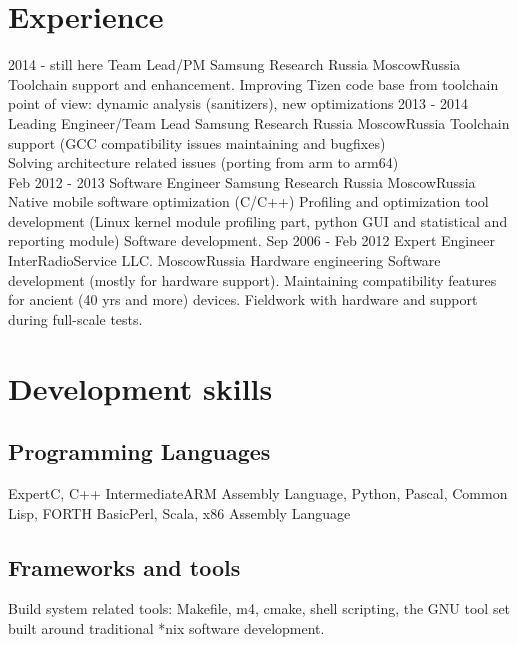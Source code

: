 \documentclass[11pt,a4paper]{moderncv}
\begin{document}
\section{Experience}
\cventry
  {2014 - still here}
  {Team Lead/PM}
  {Samsung Research Russia}
  {Moscow}{Russia}
  {Toolchain support and enhancement. Improving Tizen code base from toolchain point of view: dynamic analysis
    (sanitizers), new optimizations}
\cventry
  {2013 - 2014}
  {Leading Engineer/Team Lead}
  {Samsung Research Russia}
  {Moscow}{Russia}
  {Toolchain support (GCC compatibility issues maintaining and bugfixes)\\
Solving architecture related issues (porting from arm to arm64)\\}
\cventry
  {Feb 2012 - 2013}
  {Software Engineer}
  {Samsung Research Russia}
  {Moscow}{Russia}
  {Native mobile software optimization (C/C++)\newline{}
Profiling and optimization tool development (Linux kernel module profiling part, python GUI and statistical and reporting module)\newline{}
Software development.}
\cventry
  {Sep 2006 - Feb 2012}
  {Expert Engineer}
  {InterRadioService LLC.}
  {Moscow}{Russia}
  {Hardware engineering\newline{}
Software development (mostly for hardware support).\newline{}
Maintaining compatibility features for ancient (40 yrs and more) devices.\newline{}
Fieldwork with hardware and support during full-scale tests.\newline{}}

\section{Development skills}
\subsection{Programming Languages}
\cvitem
  {Expert}{C, C++}
\cvitem
  {Intermediate}{ARM Assembly Language, Python, Pascal, Common Lisp, FORTH}
\cvitem
  {Basic}{Perl, Scala, x86 Assembly Language}

\subsection{Frameworks and tools}
 {Build system related tools: Makefile, m4, cmake, shell scripting, the GNU tool set built around
  traditional *nix software development.}
\end{document}
